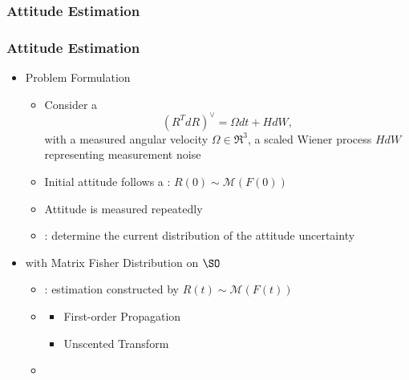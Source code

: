 \subsubsection[Estimation]{Attitude Estimation}
\begin{frame}
\frametitle{Attitude Estimation}

\begin{itemize}
\item {} Problem Formulation
	\begin{itemize}
	\item Consider a 
	\[ (R^T dR)^\vee = \Omega dt + H dW,\]
	with a measured angular velocity $\Omega\in\Re^3$, a scaled Wiener process $HdW$ representing measurement noise
	\item Initial attitude follows a : $R(0)\sim\mathcal{M}(F(0))$
	\item Attitude is measured repeatedly
	\item {}: determine the current distribution of the attitude uncertainty
	\end{itemize}
\vspace*{0.3cm}\pause
\item {} with Matrix Fisher Distribution on $\SO$
	\begin{itemize}
	\item {}: estimation constructed by $R(t)\sim\mathcal{M}(F(t))$
	\item {}
		\begin{itemize}
		\item First-order Propagation
		\item Unscented Transform
		\end{itemize}
	\item {}
	\end{itemize}
\end{itemize}
\end{frame}


